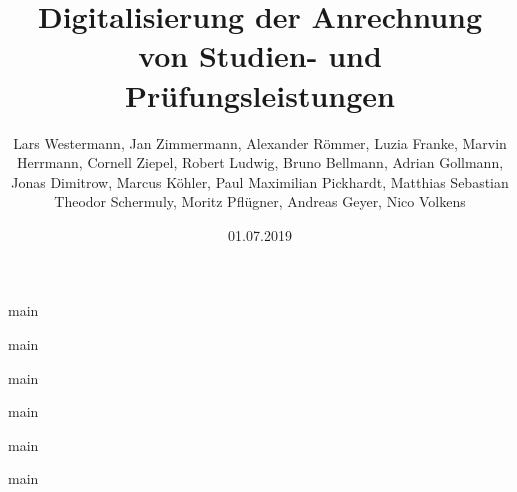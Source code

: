 \documentclass[ngerman]{tudscrreprt}
\begin{document}
\date{01.07.2019}
\author{Lars Westermann, Jan Zimmermann, Alexander Römmer, Luzia Franke, Marvin Herrmann, Cornell Ziepel, Robert Ludwig, Bruno Bellmann, Adrian Gollmann, Jonas Dimitrow, Marcus Köhler, Paul Maximilian Pickhardt, Matthias Sebastian Theodor Schermuly, Moritz Pflügner, Andreas Geyer, Nico Volkens}
\title{Digitalisierung der Anrechnung von Studien- und Prüfungsleistungen}
\maketitle

\tableofcontents

{main}

{main}

{main}

{main}

{main}

{main}
\end{document}
